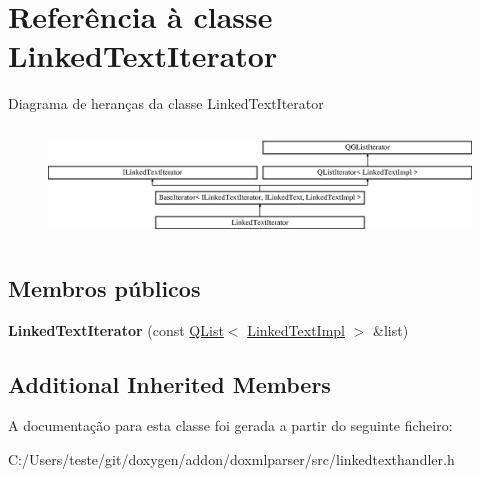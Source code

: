 \hypertarget{class_linked_text_iterator}{\section{Referência à classe Linked\-Text\-Iterator}
\label{class_linked_text_iterator}
}
Diagrama de heranças da classe Linked\-Text\-Iterator\begin{figure}[H]
\begin{center}
\leavevmode
\includegraphics[height=2.962963cm]{class_linked_text_iterator}
\end{center}
\end{figure}
\subsection*{Membros públicos}
\begin{DoxyCompactItemize}
\item 
\hypertarget{class_linked_text_iterator_aeadb91a8f468106862c3e44967387810}{{\bfseries Linked\-Text\-Iterator} (const \hyperlink{class_q_list}{Q\-List}$<$ \hyperlink{class_linked_text_impl}{Linked\-Text\-Impl} $>$ \&list)}\label{class_linked_text_iterator_aeadb91a8f468106862c3e44967387810}

\end{DoxyCompactItemize}
\subsection*{Additional Inherited Members}


A documentação para esta classe foi gerada a partir do seguinte ficheiro\-:\begin{DoxyCompactItemize}
\item 
C\-:/\-Users/teste/git/doxygen/addon/doxmlparser/src/linkedtexthandler.\-h\end{DoxyCompactItemize}
